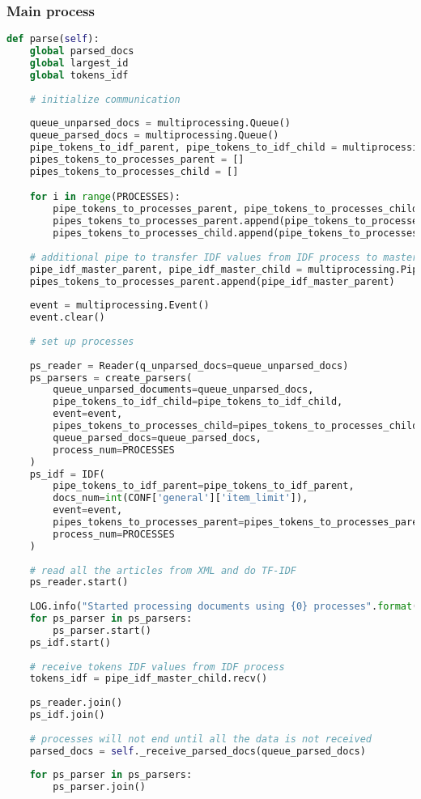 \subsubsection{Main process}
\begin{lstlisting}[language=Python, caption=Main process]
def parse(self):
    global parsed_docs
    global largest_id
    global tokens_idf
    
    # initialize communication
    
    queue_unparsed_docs = multiprocessing.Queue()
    queue_parsed_docs = multiprocessing.Queue()
    pipe_tokens_to_idf_parent, pipe_tokens_to_idf_child = multiprocessing.Pipe()
    pipes_tokens_to_processes_parent = []
    pipes_tokens_to_processes_child = []

    for i in range(PROCESSES):
	    pipe_tokens_to_processes_parent, pipe_tokens_to_processes_child = multiprocessing.Pipe()
	    pipes_tokens_to_processes_parent.append(pipe_tokens_to_processes_parent)
	    pipes_tokens_to_processes_child.append(pipe_tokens_to_processes_child)
    
    # additional pipe to transfer IDF values from IDF process to master
    pipe_idf_master_parent, pipe_idf_master_child = multiprocessing.Pipe()
    pipes_tokens_to_processes_parent.append(pipe_idf_master_parent)
    
    event = multiprocessing.Event()
    event.clear()
    
    # set up processes
    
    ps_reader = Reader(q_unparsed_docs=queue_unparsed_docs)
    ps_parsers = create_parsers(
	    queue_unparsed_documents=queue_unparsed_docs,
	    pipe_tokens_to_idf_child=pipe_tokens_to_idf_child,
	    event=event,
	    pipes_tokens_to_processes_child=pipes_tokens_to_processes_child,
	    queue_parsed_docs=queue_parsed_docs,
	    process_num=PROCESSES
    )
    ps_idf = IDF(
	    pipe_tokens_to_idf_parent=pipe_tokens_to_idf_parent,
	    docs_num=int(CONF['general']['item_limit']),
	    event=event,
	    pipes_tokens_to_processes_parent=pipes_tokens_to_processes_parent,
	    process_num=PROCESSES
    )
    
    # read all the articles from XML and do TF-IDF
    ps_reader.start()
    
    LOG.info("Started processing documents using {0} processes".format(PROCESSES))
    for ps_parser in ps_parsers:
	    ps_parser.start()
    ps_idf.start()
    
    # receive tokens IDF values from IDF process
    tokens_idf = pipe_idf_master_child.recv()
    
    ps_reader.join()
    ps_idf.join()
    
    # processes will not end until all the data is not received
    parsed_docs = self._receive_parsed_docs(queue_parsed_docs)
    
    for ps_parser in ps_parsers:
	    ps_parser.join()
\end{lstlisting}

